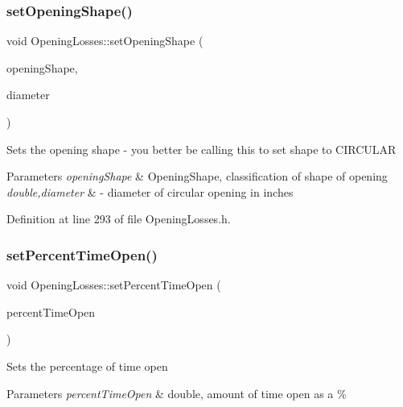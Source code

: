 \subsubsection{\texorpdfstring{set\+Opening\+Shape()}{setOpeningShape()}\hspace{0.1cm}{\footnotesize\ttfamily [2/2]}}
{\footnotesize\ttfamily void Opening\+Losses\+::set\+Opening\+Shape (\begin{DoxyParamCaption}\item[{\hyperlink{class_opening_losses_a57f9759b6fd72a1b75aa885800e26157}{Opening\+Shape} const}]{opening\+Shape,  }\item[{const double}]{diameter }\end{DoxyParamCaption})\hspace{0.3cm}{\ttfamily [inline]}}

Sets the opening shape -\/ you better be calling this to set shape to C\+I\+R\+C\+U\+L\+AR 
\begin{DoxyParams}{Parameters}
{\em opening\+Shape} & Opening\+Shape, classification of shape of opening \\
\hline
{\em double,diameter} & -\/ diameter of circular opening in inches \\
\hline
\end{DoxyParams}


Definition at line 293 of file Opening\+Losses.\+h.

\mbox{\label{class_opening_losses_a889b6aa25bf6d8fc8fb284ec0c2a1625}} 
\subsubsection{\texorpdfstring{set\+Percent\+Time\+Open()}{setPercentTimeOpen()}}
{\footnotesize\ttfamily void Opening\+Losses\+::set\+Percent\+Time\+Open (\begin{DoxyParamCaption}\item[{double}]{percent\+Time\+Open }\end{DoxyParamCaption})\hspace{0.3cm}{\ttfamily [inline]}}

Sets the percentage of time open 
\begin{DoxyParams}{Parameters}
{\em percent\+Time\+Open} & double, amount of time open as a \% \\
\hline
\end{DoxyParams}


